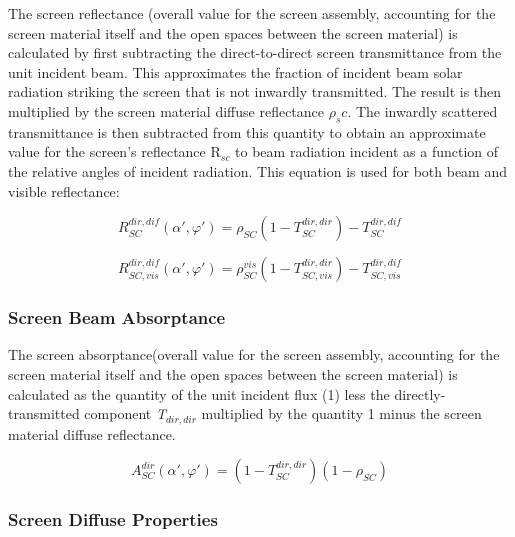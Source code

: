 The screen reflectance (overall value for the screen assembly, accounting for the screen material itself and the open spaces between the screen material) is calculated by first subtracting the direct-to-direct screen transmittance from the unit incident beam. This approximates the fraction of incident beam solar radiation striking the screen that is not inwardly transmitted. The result is then multiplied by the screen material diffuse reflectance \(\rho_sc\). The inwardly scattered transmittance is then subtracted from this quantity to obtain an approximate value for the screen's reflectance R\(_{sc}\) to beam radiation incident as a function of the relative angles of incident radiation. This equation is used for both beam and visible reflectance:

\begin{equation}
R_{SC}^{dir,dif}\left( {\alpha ',\varphi '} \right) = {\rho_{SC}}\left( {1 - T_{SC}^{dir,dir}} \right) - T_{SC}^{dir,dif}
\end{equation}

\begin{equation}
R_{SC,vis}^{dir,dif}\left( {\alpha ',\varphi '} \right) = \rho_{SC}^{vis}\left( {1 - T_{SC,vis}^{dir,dir}} \right) - T_{SC,vis}^{dir,dif}
\end{equation}

\subsubsection{Screen Beam Absorptance}\label{screen-beam-absorptance}

The screen absorptance(overall value for the screen assembly, accounting for the screen material itself and the open spaces between the screen material) is calculated as the quantity of the unit incident flux (1) less the directly-transmitted component \emph{T\(_{dir,dir}\)} multiplied by the quantity 1 minus the screen material diffuse reflectance.

\begin{equation}
A_{SC}^{dir}\left( {\alpha ',\varphi '} \right) = \left( {1 - T_{SC}^{dir,dir}} \right)\left( {1 - {\rho_{SC}}} \right)
\end{equation}

\subsubsection{Screen Diffuse Properties}\label{screen-diffuse-properties}


